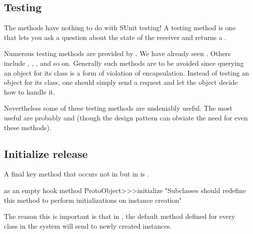 \documentclass[a4paper,10pt,twoside]{book}
\begin{document}
\subsection{Testing}

The  methods have nothing to do with SUnit testing! A testing method is one that lets you ask a question about the state of the receiver and returns a .

Numerous testing methods are provided by . We have already seen . Others include , , ,  and so on. Generally such methods are to be avoided since querying an object for its class is a form of violation of encapsulation. Instead of testing an object for its class, one should simply send a request and let the object decide how to handle it.

Nevertheless some of these testing methods are undeniably useful. The most useful are probably  and  (though the \cite{Wool98a} design pattern can obviate the need for even these methods).


\subsection{Initialize release}

A final key method that occurs not in  but in  is .

\begin{method}{ as an empty hook method}
ProtoObject>>>initialize
   "Subclasses should redefine this method to perform initializations on instance creation"
\end{method}

The reason this is important is that in \pharo, the default  method defined for every class in the system will send  to newly created instances.
\end{document}
